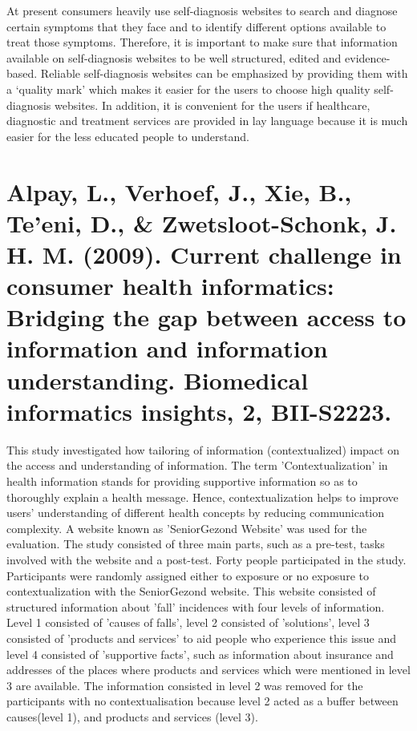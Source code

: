 \documentclass[]{article}
\begin{document}
At present consumers heavily use self-diagnosis websites to search and diagnose certain symptoms that they face and to identify different options available to treat those symptoms. Therefore, it is important to make sure that information available on self-diagnosis websites to be well structured, edited and evidence-based. Reliable self-diagnosis websites can be emphasized by providing them with a ‘quality mark’ which makes it easier for the users to choose high quality self-diagnosis websites. In addition, it is convenient for the users if healthcare, diagnostic and treatment services are provided in lay language because it is much easier for the less educated people to understand.       

\section{Alpay, L., Verhoef, J., Xie, B., Te'eni, D., \& Zwetsloot-Schonk, J. H. M. (2009). Current challenge in consumer health informatics: Bridging the gap between access to information and information understanding. Biomedical informatics insights, 2, BII-S2223.}

This study investigated how tailoring of information (contextualized) impact on the access and understanding of information. The term 'Contextualization' in health information stands for providing supportive information so as to thoroughly explain a health message. Hence, contextualization helps to improve users' understanding of different health concepts by reducing communication complexity. A website known as 'SeniorGezond Website' was used for the evaluation. The study consisted of three main parts, such as a pre-test, tasks involved with the website and a post-test. Forty people participated in the study. Participants were randomly assigned either to exposure or no exposure to contextualization with the SeniorGezond website. This website consisted of structured information about 'fall' incidences with four levels of information. Level 1 consisted of 'causes of falls', level 2 consisted of 'solutions', level 3 consisted of 'products and services' to aid people who experience this issue and level 4 consisted of 'supportive facts', such as information about insurance and addresses of the places where products and services which were mentioned in level 3 are available. The information consisted in level 2 was removed for the participants with no contextualisation because level 2 acted as a buffer between causes(level 1), and products and services (level 3).
\end{document}
